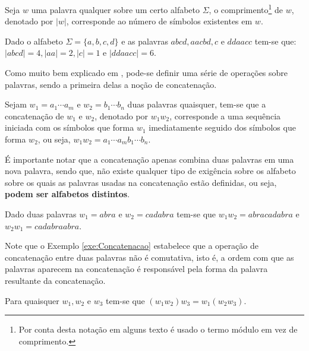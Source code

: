 \begin{definicao}\label{def:ComprimentoPalavra}
	Seja $w$ uma palavra qualquer sobre um certo alfabeto $\Sigma$, o comprimento\footnote{Por conta desta notação em alguns texto é usado o termo módulo em vez de comprimento.} de $w$, denotado por $|w|$, corresponde ao número de símbolos existentes em $w$.
\end{definicao}

\begin{exemplo}
	Dado o alfabeto $\Sigma = \{a, b, c, d\}$ e as palavras $abcd, aacbd, c$ e $ddaacc$ tem-se que: $|abcd| = 4, |aa| = 2, |c| = 1$ e $|ddaacc| = 6$.
\end{exemplo}

Como muito bem explicado em \cite{benjaLivro2010, hopcroft2008, linz2006}, pode-se definir uma série de operações sobre palavras, sendo a primeira delas  a noção de concatenação.

\begin{definicao}\label{def:Concatenacao}
	Sejam $w_1 = a_1\cdots a_m$ e $w_2 = b_1\cdots b_n$ duas palavras quaisquer, tem-se que a concatenação de $w_1$ e $w_2$, denotado por $w_1w_2$, corresponde a uma sequência iniciada com os símbolos que forma $w_1$ imediatamente seguido dos símbolos que forma $w_2$, ou seja, $w_1w_2 = a_1\cdots a_mb_1\cdots b_n$.
\end{definicao}

É importante notar que a concatenação apenas combina duas palavras em uma nova palavra, sendo que, não existe qualquer tipo de exigência sobre os alfabeto sobre os quais as palavras usadas na concatenação estão definidas, ou seja, \textbf{podem ser alfabetos distintos}.

\begin{exemplo}\label{exe:Concatenacao}
	Dado duas palavras $w_1 = abra$ e $w_2 = cadabra$ tem-se que $w_1w_2 = abracadabra$ e $w_2w_1 = cadabraabra$.
\end{exemplo}

Note que o Exemplo \ref{exe:Concatenacao} estabelece que a operação de concatenação entre duas palavras não é comutativa, isto é, a ordem com que as palavras aparecem na concatenação é responsável pela forma da palavra resultante da concatenação.

\begin{teorema}\label{teo:AssociatividaeConcatenacao}
	Para quaisquer $w_1, w_2$ e $w_3$ tem-se que $(w_1w_2)w_3 = w_1(w_2w_3)$.
\end{teorema}

